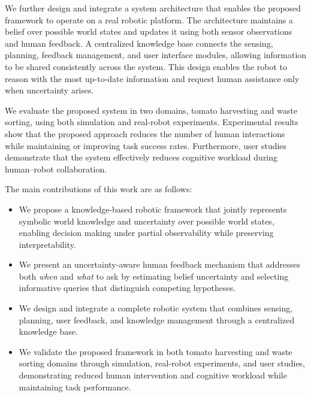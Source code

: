 
We further design and integrate a system architecture that enables the proposed framework to operate on a real robotic platform. The architecture maintains a belief over possible world states and updates it using both sensor observations and human feedback. A centralized knowledge base connects the sensing, planning, feedback management, and user interface modules, allowing information to be shared consistently across the system. This design enables the robot to reason with the most up-to-date information and request human assistance only when uncertainty arises.

We evaluate the proposed system in two domains, tomato harvesting and waste sorting, using both simulation and real-robot experiments. Experimental results show that the proposed approach reduces the number of human interactions while maintaining or improving task success rates. Furthermore, user studies demonstrate that the system effectively reduces cognitive workload during human--robot collaboration.

The main contributions of this work are as follows:
\begin{itemize}[leftmargin=*]
    \item We propose a knowledge-based robotic framework that jointly represents symbolic world knowledge and uncertainty over possible world states, enabling decision making under partial observability while preserving interpretability.
    \item We present an uncertainty-aware human feedback mechanism that addresses both \textit{when} and \textit{what} to ask by estimating belief uncertainty and selecting informative queries that distinguish competing hypotheses.
    \item We design and integrate a complete robotic system that combines sensing, planning, user feedback, and knowledge management through a centralized knowledge base.
    \item We validate the proposed framework in both tomato harvesting and waste sorting domains through simulation, real-robot experiments, and user studies, demonstrating reduced human intervention and cognitive workload while maintaining task performance.
\end{itemize}
